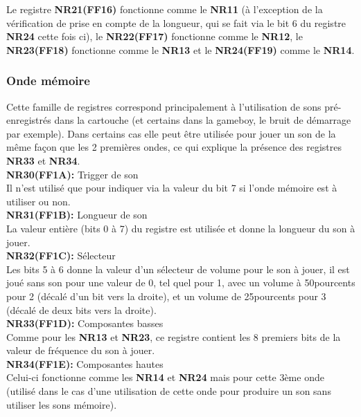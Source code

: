 \documentclass{report}
\begin{document}
	Le registre \textbf{NR21(FF16)} fonctionne comme le \textbf{NR11} (à
		l'exception de la vérification de prise en compte de
		la longueur, qui se fait via le bit 6 du registre \textbf{NR24}
		cette fois ci), le \textbf{NR22(FF17)} fonctionne comme le
		\textbf{NR12}, le \textbf{NR23(FF18)} fonctionne comme le \textbf{NR13} et le
		\textbf{NR24(FF19)} comme le \textbf{NR14}. 
			
	\subsubsection{Onde mémoire}
		Cette famille de registres correspond principalement à
		l'utilisation de sons pré-enregistrés dans la cartouche
		(et certains dans la gameboy, le bruit de démarrage par
		exemple).
		Dans certains cas elle peut être utilisée pour jouer un son de
		la même façon que les 2 premières ondes, ce qui explique la
		présence des registres \textbf{NR33} et \textbf{NR34}. \\ 
		
	\textbf{NR30(FF1A):} Trigger de son \\ 
		Il n'est utilisé que pour indiquer via la
		valeur du bit 7 si l'onde mémoire est à utiliser ou
		non.\\
		
	\textbf{NR31(FF1B):} Longueur de son \\
		La valeur entière (bits 0 à 7) du
		registre est utilisée et donne la longueur du son à
		jouer.\\ 
		
	\textbf{NR32(FF1C):} Sélecteur \\
		Les bits 5 à 6 donne la valeur d'un
		sélecteur de volume pour le son à jouer, il est joué
		sans son pour une valeur de 0, tel quel pour 1, avec un volume à 50pourcents 
		pour 2 (décalé d'un bit vers la droite), et un volume
		de 25pourcents pour 3 (décalé de deux bits vers la droite). \\
		
	\textbf{NR33(FF1D):} Composantes basses \\
		Comme pour les \textbf{NR13} et \textbf{NR23}, ce registre
		contient les 8 premiers bits de la valeur de fréquence
		du son à jouer.\\

	\textbf{NR34(FF1E):} Composantes hautes \\
		Celui-ci fonctionne comme les \textbf{NR14} et \textbf{NR24} mais pour
		cette 3ème onde (utilisé dans le cas d'une utilisation
		de cette onde pour produire un son sans utiliser les
		sons mémoire). \\
\end{document}
